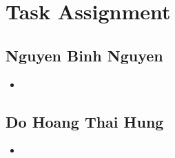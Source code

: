 \chapter{Task Assignment}

\section*{Nguyen Binh Nguyen}
\begin{itemize}
    \item 
\end{itemize}

\section*{Do Hoang Thai Hung}
\begin{itemize}
    \item 
\end{itemize}
